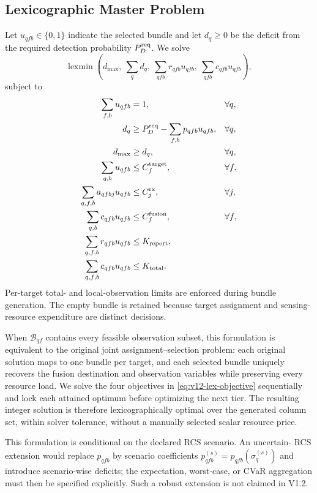 \subsection{Lexicographic Master Problem}
Let $u_{qfb}\in\{0,1\}$ indicate the selected bundle and let $d_q\geq0$ be
the deficit from the required detection probability $P_D^{\rm req}$.  We solve
\begin{equation}
\operatorname{lexmin}\left(
d_{\max},\ \sum_q d_q,\ \sum_{qfb}r_{qfb}u_{qfb},\
\sum_{qfb}c_{qfb}u_{qfb}\right),
\label{eq:v12-lex-objective}
\end{equation}
subject to
\begin{align}
\sum_{f,b}u_{qfb}&=1, &&\forall q,\label{eq:v12-one-bundle}\\
d_q&\geq P_D^{\rm req}-\sum_{f,b}p_{qfb}u_{qfb}, &&\forall q,\\
d_{\max}&\geq d_q, &&\forall q,\\
\sum_{q,b}u_{qfb}&\leq C_f^{\rm target}, &&\forall f,\\
\sum_{q,f,b}a_{qfbj}u_{qfb}&\leq C_j^{\rm rx}, &&\forall j,\\
\sum_{q,b}c_{qfb}u_{qfb}&\leq C_f^{\rm fusion}, &&\forall f,\\
\sum_{q,f,b}r_{qfb}u_{qfb}&\leq K_{\rm report},\\
\sum_{q,f,b}c_{qfb}u_{qfb}&\leq K_{\rm total}.
\end{align}
Per-target total- and local-observation limits are enforced during bundle
generation.  The empty bundle is retained because target assignment and
sensing-resource expenditure are distinct decisions.

When $\mathcal B_{qf}$ contains every feasible observation subset, this
formulation is equivalent to the original joint assignment--selection problem:
each original solution maps to one bundle per target, and each selected bundle
uniquely recovers the fusion destination and observation variables while
preserving every resource load.  We solve the four objectives in
\eqref{eq:v12-lex-objective} sequentially and lock each attained optimum before
optimizing the next tier.  The resulting integer solution is therefore
lexicographically optimal over the generated column set, within solver
tolerance, without a manually selected scalar resource price.

This formulation is conditional on the declared RCS scenario.  An uncertain-
RCS extension would replace $p_{qfb}$ by scenario coefficients
$p^{(s)}_{qfb}=p_{qfb}(\sigma_q^{(s)})$ and introduce scenario-wise deficits;
the expectation, worst-case, or CVaR aggregation must then be specified
explicitly.  Such a robust extension is not claimed in V1.2.

